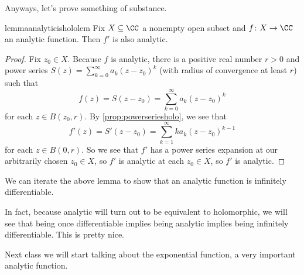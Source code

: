 \documentclass[../notes.tex]{subfiles}
\begin{document}
Anyways, let's prove something of substance.
\begin{restatable}{lemma}{analyticishololem} \label{lem:ddzanaisana}
	Fix $X\subseteq\CC$ a nonempty open subset and $f\colon X\to\CC$ an analytic function. Then $f'$ is also analytic.
\end{restatable}
\begin{proof}
	Fix $z_0\in X$. Because $f$ is analytic, there is a positive real number $r>0$ and power series $S(z)=\sum_{k=0}^\infty a_k(z-z_0)^k$ (with radius of convergence at least $r$) such that
	\[f(z)=S(z-z_0)=\sum_{k=0}^\infty a_k(z-z_0)^k\]
	for each $z\in B(z_0,r)$. By \autoref{prop:powerseriesholo}, we see that
	\[f'(z)=S'(z-z_0)=\sum_{k=1}^\infty ka_k(z-z_0)^{k-1}\]
	for each $z\in B(0,r)$. So we see that $f'$ has a power series expansion at our arbitrarily chosen $z_0\in X$, so $f'$ is analytic at each $z_0\in X$, so $f'$ is analytic.
\end{proof}
\begin{remark}
	We can iterate the above lemma to show that an analytic function is infinitely differentiable.
\end{remark}
\begin{remark}
	In fact, because analytic will turn out to be equivalent to holomorphic, we will see that being once differentiable implies being analytic implies being infinitely differentiable. This is pretty nice.
\end{remark}
Next class we will start talking about the exponential function, a very important analytic function.
\end{document}
